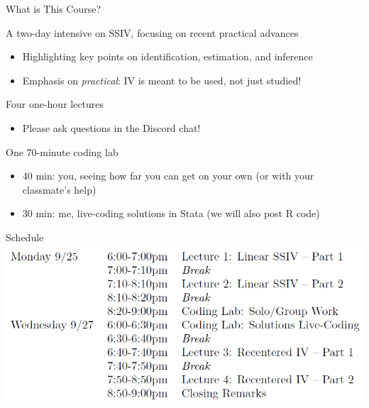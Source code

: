 \documentclass[t]{beamer}
\begin{document}
\begin{frame}{What is This Course?}

A two-day intensive on SSIV, focusing on recent practical advances

\begin{itemize}
  \item Highlighting key points on identification, estimation, and inference
  \item Emphasis on \emph{practical}: IV is meant to be used, not just studied!
\end{itemize}\pause\medskip

Four one-hour lectures

\begin{itemize}
  \item Please ask questions in the Discord chat!
\end{itemize}\pause\medskip

One 70-minute coding lab
\begin{itemize}
  \item 40 min: you, seeing how far you can get on your own (or with your classmate's help)
  \item 30 min: me, live-coding solutions in Stata (we will also post R code)
\end{itemize}

\end{frame}

\begin{frame}{Schedule}
\vspace*{\fill}
\includegraphics[scale=0.55]{./lecture_includes/schedule.png}
\vspace*{\fill}
\end{frame}
\end{document}
